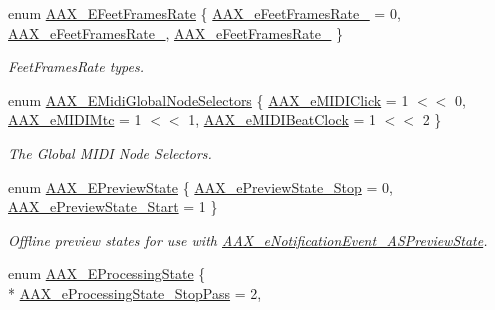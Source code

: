 \begin{DoxyCompactItemize}
enum \hyperlink{a00206_a8a0c9dafef741a26ee8c06f7285a0dfa}{A\+A\+X\+\_\+\+E\+Feet\+Frames\+Rate} \{ \hyperlink{a00206_a8a0c9dafef741a26ee8c06f7285a0dfaa30fa0a62d08c15106c38d98fbb9c9b62}{A\+A\+X\+\_\+e\+Feet\+Frames\+Rate\+\_} = 0, 
\hyperlink{a00206_a8a0c9dafef741a26ee8c06f7285a0dfaaafabb0537ad8554a052f26f04e1ca0c5}{A\+A\+X\+\_\+e\+Feet\+Frames\+Rate\+\_}, 
\hyperlink{a00206_a8a0c9dafef741a26ee8c06f7285a0dfaa603154b5e8d45a9a940ba236a728f08e}{A\+A\+X\+\_\+e\+Feet\+Frames\+Rate\+\_}
 \}
\begin{DoxyCompactList}\small\item\em Feet\+Frames\+Rate types. \end{DoxyCompactList}\item 
enum \hyperlink{a00206_a349dae6bc64bda67a5440cbc6637f92d}{A\+A\+X\+\_\+\+E\+Midi\+Global\+Node\+Selectors} \{ \hyperlink{a00206_a349dae6bc64bda67a5440cbc6637f92da07f7ef0ac806b94f96cc14e81678b84a}{A\+A\+X\+\_\+e\+M\+I\+D\+I\+Click} = 1 $<$$<$ 0, 
\hyperlink{a00206_a349dae6bc64bda67a5440cbc6637f92da29d1a888ea18fe3f32c7231ceb964e61}{A\+A\+X\+\_\+e\+M\+I\+D\+I\+Mtc} = 1 $<$$<$ 1, 
\hyperlink{a00206_a349dae6bc64bda67a5440cbc6637f92da7345d01457a861d2acb2e91d5669b803}{A\+A\+X\+\_\+e\+M\+I\+D\+I\+Beat\+Clock} = 1 $<$$<$ 2
 \}
\begin{DoxyCompactList}\small\item\em The Global M\+I\+D\+I Node Selectors. \end{DoxyCompactList}\item 
enum \hyperlink{a00206_a12b280d7ccf22568759f8deb1fe1d6a8}{A\+A\+X\+\_\+\+E\+Preview\+State} \{ \hyperlink{a00206_a12b280d7ccf22568759f8deb1fe1d6a8a70cc710d78a2ea494e2c251da8856c6e}{A\+A\+X\+\_\+e\+Preview\+State\+\_\+\+Stop} = 0, 
\hyperlink{a00206_a12b280d7ccf22568759f8deb1fe1d6a8a57da8c1b6b2ad294a707bb3ccf0fd68d}{A\+A\+X\+\_\+e\+Preview\+State\+\_\+\+Start} = 1
 \}
\begin{DoxyCompactList}\small\item\em Offline preview states for use with \hyperlink{a00206_afab5ea2cfd731fc8f163b6caa685406ea8ca3f7d5e93eecf945682f6fc55f5263}{A\+A\+X\+\_\+e\+Notification\+Event\+\_\+\+A\+S\+Preview\+State}. \end{DoxyCompactList}\item 
enum \hyperlink{a00206_a6ec854be40c8cf810dec97de3e56c0a7}{A\+A\+X\+\_\+\+E\+Processing\+State} \{ \\*
\hyperlink{a00206_a6ec854be40c8cf810dec97de3e56c0a7a07e96f54fb45a47b56e76091f0f44cbf}{A\+A\+X\+\_\+e\+Processing\+State\+\_\+\+Stop\+Pass} = 2, 
$$
\end{DoxyCompactItemize}
